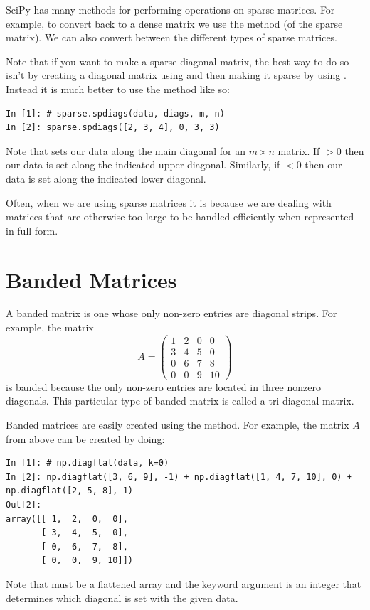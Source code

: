 SciPy has many methods for performing operations on sparse matrices. For example, to convert back to a dense matrix we use the  method (of the sparse matrix). We can also convert between the different types of sparse matrices.

Note that if you want to make a sparse diagonal matrix, the best way to do so isn't by creating a diagonal matrix using  and then making it sparse by using . Instead it is much better to use the  method like so:

\begin{lstlisting}
In [1]: # sparse.spdiags(data, diags, m, n)
In [2]: sparse.spdiags([2, 3, 4], 0, 3, 3) 
\end{lstlisting}

Note that  sets our data along the main diagonal for an $m \times n$ matrix. If  $> 0$ then our data is set along the indicated upper diagonal. Similarly, if  $< 0$ then our data is set along the indicated lower diagonal. 

Often, when we are using sparse matrices it is because we are dealing with matrices that are otherwise too large to be handled efficiently when represented in full form.


\section*{Banded Matrices}
A banded matrix is one whose only non-zero entries are diagonal
strips.  For example, the matrix
\begin{equation*}
A = \begin{pmatrix}
1 & 2 & 0 & 0 \\
3 & 4 & 5 & 0 \\
0 & 6 & 7 & 8 \\
0 & 0 & 9 & 10
\end{pmatrix}
\end{equation*}
is banded because the only non-zero entries are located in three nonzero diagonals.  This particular type of banded matrix is called a tri-diagonal matrix.

Banded matrices are easily created using the  method.
For example, the matrix $A$ from above can be created by doing:

\begin{lstlisting}
In [1]: # np.diagflat(data, k=0)
In [2]: np.diagflat([3, 6, 9], -1) + np.diagflat([1, 4, 7, 10], 0) + np.diagflat([2, 5, 8], 1)
Out[2]: 
array([[ 1,  2,  0,  0],
       [ 3,  4,  5,  0],
       [ 0,  6,  7,  8],
       [ 0,  0,  9, 10]])

\end{lstlisting}
Note that  must be a flattened array and the keyword argument  is an integer that determines which diagonal is set with the given data. 

